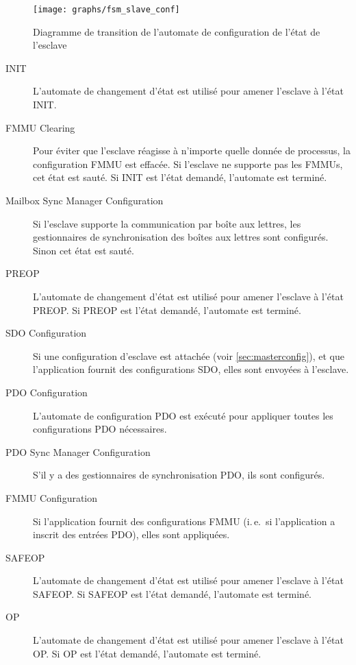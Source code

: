 \documentclass[a4paper,12pt,BCOR=6mm,bibtotoc,idxtotoc]{scrbook}
\begin{document}
\begin{figure}[htbp]
  \centering
  \texttt{[image: graphs/fsm\_slave\_conf]}
  \caption{Diagramme de transition de l'automate de configuration de
    l'\'etat de l'esclave}
  \label{fig:fsm-slaveconf}
\end{figure}

\begin{description}

\item[INIT] L'automate de changement d'\'etat est utilis\'e pour
  amener l'esclave \`a l'\'etat INIT.

\item[FMMU Clearing] Pour \'eviter que l'esclave r\'eagisse \`a
  n'importe quelle donn\'ee de processus, la configuration FMMU est
  effac\'ee.  Si l'esclave ne supporte pas les FMMUs, cet \'etat est
  saut\'e.  Si INIT est l'\'etat demand\'e, l'automate est termin\'e.

\item[Mailbox Sync Manager Configuration] Si l'esclave supporte la
  communication par bo\^ite aux lettres, les gestionnaires de
  synchronisation des bo\^ites aux lettres sont configur\'es. Sinon
  cet \'etat est saut\'e.

\item[PREOP] L'automate de changement d'\'etat est utilis\'e pour amener
  l'esclave \`a l'\'etat PREOP. Si PREOP est l'\'etat demand\'e, l'automate
  est termin\'e.

\item[SDO Configuration] Si une configuration d'esclave est attach\'ee
  (voir \autoref{sec:masterconfig}), et que l'application fournit des
  configurations SDO, elles sont envoy\'ees \`a l'esclave.


\item[PDO Configuration] L'automate de configuration PDO est ex\'ecut\'e
  pour appliquer toutes les configurations PDO n\'ecessaires.

\item[PDO Sync Manager Configuration] S'il y a des gestionnaires
  de synchronisation PDO, ils sont configur\'es.

\item[FMMU Configuration] Si l'application fournit des configurations
  FMMU (i.\,e.\ si l'application a inscrit des entr\'ees PDO), elles
  sont appliqu\'ees.

\item[SAFEOP] L'automate de changement d'\'etat est utilis\'e pour
  amener l'esclave \`a l'\'etat SAFEOP. Si SAFEOP est l'\'etat
  demand\'e, l'automate est termin\'e.

\item[OP] L'automate de changement d'\'etat est utilis\'e pour
  amener l'esclave \`a l'\'etat OP. Si OP est l'\'etat demand\'e,
  l'automate est termin\'e.

\end{description}
\end{document}
